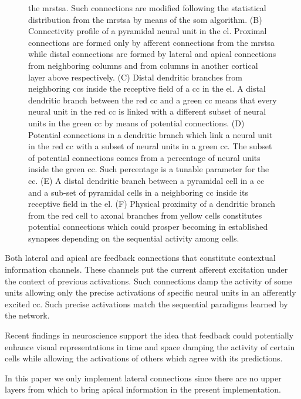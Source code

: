 \documentclass[11pt,a4paper]{article}
\begin{document}
\begin{figure}[h!]
{    the \gls{mrstsa}.
    Such connections are modified following the statistical distribution from the \gls{mrstsa}
    by means of the \gls{som} algorithm.
    (B) Connectivity profile of a pyramidal neural unit in the \gls{el}.
    Proximal connections are formed only by afferent connections from the \gls{mrstsa}
    while distal connections are formed by lateral and apical connections from neighboring columns and
    from columns in another cortical layer above respectively.
    (C) Distal dendritic branches from neighboring \glspl{cc} inside the receptive field
    of a \gls{cc} in the \gls{el}. A distal dendritic branch between the red \gls{cc} and a
    green \gls{cc} means that every neural unit in the red \gls{cc} is linked with a different
    subset of neural units in the green \gls{cc} by means of potential connections.
    (D) Potential connections in a dendritic branch which link a neural unit in the red \gls{cc}
    with a subset of neural units in a green \gls{cc}. The subset of potential connections comes from a percentage of neural units
    inside the green \gls{cc}. Such percentage is a tunable parameter for the \gls{cc}.
    (E) A distal dendritic branch between a pyramidal cell in a \gls{cc} and a 
    sub-set of pyramidal cells in a neighboring \gls{cc} inside its receptive field
    in the \gls{el}.
    (F) Physical proximity of a dendritic branch from the red cell to axonal branches from yellow cells constitutes potential connections
    which could prosper becoming in established synapses depending on the sequential activity among cells.}
    \label{fig:Connectivity}
\end{figure}
\fi

Both lateral and apical are feedback connections that constitute contextual information channels. 
These channels put the current afferent excitation under the context of previous activations.
Such connections damp the activity of some units allowing only the precise activations
of specific neural units in an afferently excited \gls{cc}.
Such precise activations match the sequential paradigms learned by the network.

Recent findings in neuroscience \cite{Marques2018} support the idea 
that feedback could potentially enhance visual representations in time and space
damping the activity of certain cells while allowing the activations  of others
which agree with its predictions.

In this paper we only implement lateral connections since
there are no upper layers 
from which to bring apical information in the present implementation.
\end{document}
